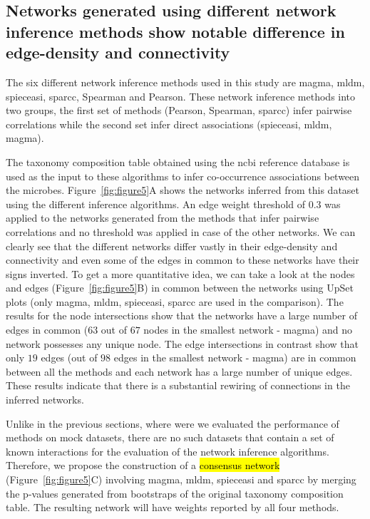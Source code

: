   \FloatBarrier

  \subsection*{Networks generated using different network inference methods show notable difference in edge-density and connectivity}

  The six different network inference methods used in this study are \ac{magma}, \ac{mldm}, \ac{spieceasi}, \ac{sparcc}, Spearman and Pearson.
  These network inference methods into two groups, the first set of methods (Pearson, Spearman, \ac{sparcc}) infer pairwise correlations while the second set infer direct associations (\ac{spieceasi}, \ac{mldm}, \ac{magma}).

  The taxonomy composition table obtained using the \ac{ncbi} reference database is used as the input to these algorithms to infer co-occurrence associations between the microbes.
  Figure~\ref{fig:figure5}A shows the networks inferred from this dataset using the different inference algorithms.
  An edge weight threshold of 0.3 was applied to the networks generated from the methods that infer pairwise correlations and no threshold was applied in case of the other networks.
  We can clearly see that the different networks differ vastly in their edge-density and connectivity and even some of the edges in common to these networks have their signs inverted.
  To get a more quantitative idea, we can take a look at the nodes and edges (Figure~\ref{fig:figure5}B) in common between the networks using UpSet plots (only \ac{magma}, \ac{mldm}, \ac{spieceasi}, \ac{sparcc} are used in the comparison).
  The results for the node intersections show that the networks have a large number of edges in common ($63$ out of $67$ nodes in the smallest network - \ac{magma}) and no network possesses any unique node.
  The edge intersections in contrast show that only $19$ edges (out of $98$ edges in the smallest network - \ac{magma}) are in common between all the methods and each network has a large number of unique edges.
  These results indicate that there is a substantial rewiring of connections in the inferred networks.

  Unlike in the previous sections, where were we evaluated the performance of methods on mock datasets, there are no such datasets that contain a set of known interactions for the evaluation of the network inference algorithms.
  Therefore, we propose the construction of a \hl{consensus network} (Figure~\ref{fig:figure5}C) involving \ac{magma}, \ac{mldm}, \ac{spieceasi} and \ac{sparcc} by merging the p-values generated from bootstraps of the original taxonomy composition table.
  The resulting network will have weights reported by all four methods.

